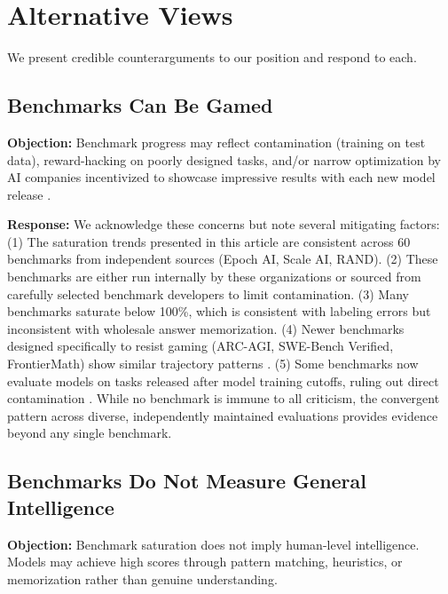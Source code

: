 \documentclass[letterpaper,twocolumn]{article}
\begin{document}
\section{Alternative Views}
\label{sec:alternatives}

We present credible counterarguments to our position and respond to each.

\subsection{Benchmarks Can Be Gamed}
\label{subsec:alt_contamination}

\textbf{Objection:} Benchmark progress may reflect contamination (training on test data), reward-hacking on poorly designed tasks, and/or narrow optimization by AI companies incentivized to showcase impressive results with each new model release \citep{balloccu_leak_2024, robison_meta_2025}.

\textbf{Response:} We acknowledge these concerns but note several mitigating factors: (1) The saturation trends presented in this article are consistent across 60 benchmarks from independent sources (Epoch AI, Scale AI, RAND). (2) These benchmarks are either run internally by these organizations or sourced from carefully selected benchmark developers \citep{epoch_ai_ai_2024} to limit contamination. (3) Many benchmarks saturate below 100\%, which is consistent with labeling errors but inconsistent with wholesale answer memorization. (4) Newer benchmarks designed specifically to resist gaming (ARC-AGI, SWE-Bench Verified, FrontierMath) show similar trajectory patterns \citep{chollet_measure_2019,epoch_ai_swe-bench_2024,epoch_ai_frontiermath_2025}. (5) Some benchmarks now evaluate models on tasks released after model training cutoffs, ruling out direct contamination \citep{white_livebench_2025}. While no benchmark is immune to all criticism, the convergent pattern across diverse, independently maintained evaluations provides evidence beyond any single benchmark.

\subsection{Benchmarks Do Not Measure General Intelligence}
\label{subsec:alt_benchmarks}

\textbf{Objection:} Benchmark saturation does not imply human-level intelligence.
Models may achieve high scores through pattern matching, heuristics, or memorization rather than genuine understanding.
\end{document}
